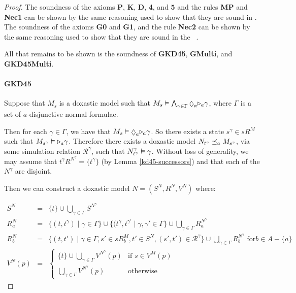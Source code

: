 \begin{proof}
The soundness of the axioms {\bf P}, {\bf K}, {\bf D}, {\bf 4}, and {\bf 5} and the
rules {\bf MP} and {\bf Nec1} can be shown by the same reasoning used to show
that they are sound in \logicKD{}. The soundness of the axioms {\bf G0} and {\bf
G1}, and the rule {\bf Nec2} can be shown by the same reasoning used to show
that they are sound in the \logicKiF{}~\cite{french2010future}.

All that remains to be shown is the soundness of {\bf GKD45}, {\bf GMulti}, and
{\bf GKD45Multi}.

\paragraph{GKD45}
Suppose that $M_s$ is a doxastic model such that $M_s \entails \bigwedge_{\gamma
\in \Gamma} \suspects_a \somerefs_a \gamma$, where $\Gamma$ is a set of
$a$-disjunctive normal formulae.

Then for each $\gamma \in \Gamma$, we have that $M_s \entails \suspects_a
\somerefs_a \gamma$. So there exists a state $s^\gamma \in sR^M$ such
that $M_{s^\gamma} \vDash {\ensuremath{\mathopen{\triangleright}}}_a \gamma$. Therefore there exists a
doxastic model $N_{t^\gamma} \preceq_a M_{s^\gamma}$, via some simulation
relation $\mathcal{R}^\gamma$, such that $N^\gamma_{t^\gamma} \vDash \gamma$.
Without loss of generality, we may assume that $t^\gamma R^{N^\gamma} =
\{t^\gamma\}$ (by Lemma \ref{kd45-successors}) and that each of the $N^\gamma$
are disjoint.

Then we can construct a doxastic model $N = (S^N, R^N, V^N)$ where:

\begin{eqnarray*}
S^N &=& \{t\} \cup \bigcup_{\gamma \in \Gamma} S^{N^\gamma}\\
R^N_a &=& \{(t, t^\gamma) \mid \gamma \in \Gamma\} \cup \{(t^\gamma,
t^{\gamma'} \mid \gamma, \gamma' \in \Gamma\} \cup \bigcup_{\gamma \in
\Gamma} R^{N^\gamma}_a\\
R^N_b &=& \{(t, t') \mid \gamma \in \Gamma, s' \in sR^M_b, t' \in S^N, (s', t') \in
\mathcal{R}^\gamma \} \cup \bigcup_{\gamma \in \Gamma} R^{N^\gamma}_b \text{ for
$b \in A - \{a\}$}\\
V^N(p) &=& \begin{cases}
\{t\} \cup \bigcup_{\gamma \in \Gamma} V^{N^\gamma}(p) & \text{if $s \in
V^M(p)$}\\
\bigcup_{\gamma \in \Gamma} V^{N^\gamma}(p) & \text{otherwise}
\end{cases}
\end{eqnarray*}


\end{proof}
